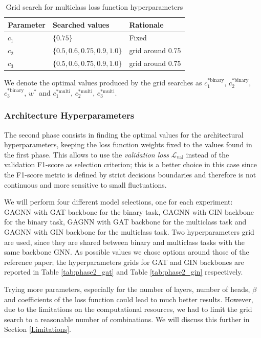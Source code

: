\begin{table}
\centering
\begin{tabular}{l l l}
\hline
\textbf{Parameter} & \textbf{Searched values} & \textbf{Rationale} \\
\hline
$c_1$ & $\{0.75\}$ & Fixed \\
$c_2$ & $\{0.5, 0.6, 0.75, 0.9, 1.0\}$ & grid around 0.75 \\
$c_3$ & $\{0.5, 0.6, 0.75, 0.9, 1.0\}$ & grid around 0.75 \\
\hline
\end{tabular}
\caption{Grid search for multiclass loss function hyperparameters}
\label{tab:phase1_multi}
\end{table}

We denote the optimal values produced by the grid searches as \(c_1^{*\text{binary}}\), \(c_2^{*\text{binary}}\), \(c_3^{*\text{binary}}\), \(w^*\) and $c_1^{*\text{multi}}$, $c_2^{*\text{multi}}$, $c_3^{*\text{multi}}$.

\subsubsection{Architecture Hyperparameters}
\label{sec:gagnn_hp}
The second phase consists in finding the optimal values for the architectural hyperparameters, keeping the loss function weights fixed to the values found in the first phase. This allows to use the \textit{validation loss} \(\mathcal{L}_{\text{val}}\) instead of the validation F1-score as selection criterion; this is a better choice in this case since the F1-score metric is defined by strict decisions boundaries and therefore is not continuous and more sensitive to small fluctuations.

We will perform four different model selections, one for each experiment: GAGNN with GAT backbone for the binary task, GAGNN with GIN backbone for the binary task, GAGNN with GAT backbone for the multiclass task and GAGNN with GIN backbone for the multiclass task. Two hyperparameters grid are used, since they are shared between binary and multiclass tasks with the same backbone GNN. As possible values we chose options around those of the reference paper; the hyperparameters grids for GAT and GIN backbones are reported in Table \ref{tab:phase2_gat} and Table \ref{tab:phase2_gin} respectively.

Trying more parameters, especially for the number of layers, number of heads, \(\beta\) and coefficients of the loss function could lead to much better results. However, due to the limitations on the computational resources, we had to limit the grid search to a reasonable number of combinations. We will discuss this further in Section \ref{Limitations}.

